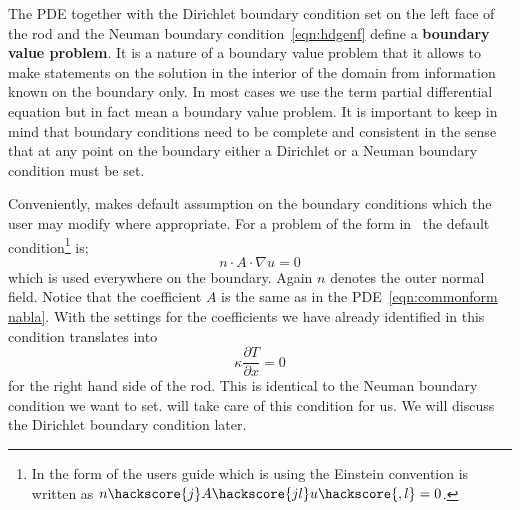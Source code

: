 The PDE  together with the Dirichlet boundary condition set on the left face of the rod
and the Neuman boundary condition~\ref{eqn:hdgenf} define a \textbf{boundary value problem}. 
It is a nature of a boundary value problem that it allows to make statements on the solution in the
interior of the domain from information known on the boundary only. In most cases
we use the term partial differential equation but in fact mean a boundary value problem. 
It is important to keep in mind that boundary conditions need to be complete and consistent in the sense that 
at any point on the boundary either a Dirichlet or a Neuman boundary condition must be set.

Conveniently, \esc makes default assumption on the boundary conditions which the user may modify where appropriate. 
For a problem of the form in~ the default condition\footnote{In the form of the \esc users guide which is using the Einstein convention is written as 
$n\hackscore{j}A\hackscore{jl} u\hackscore{,l}=0$.} is;
\begin{equation}\label{NEUMAN 2}
n\cdot A \cdot\nabla u = 0 
\end{equation}
which is used everywhere on the boundary. Again $n$ denotes the outer normal field. 
Notice that the coefficient $A$ is the same as in the \esc PDE~\ref{eqn:commonform nabla}. 
With the settings for the coefficients we have already identified in  this
condition translates into 
\begin{equation}\label{NEUMAN 2b}
\kappa \frac{\partial T}{\partial x} = 0 
\end{equation}
for the right hand side of the rod. This is identical to the Neuman boundary condition we want to set. \esc will take care of this condition for us. We will discuss the Dirichlet boundary condition later.


